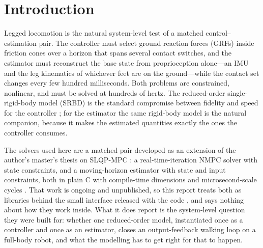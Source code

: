 \documentclass[11pt]{article}
\begin{document}
\section{Introduction}
Legged locomotion is the natural system-level test of a matched control--estimation pair. The controller must select ground reaction forces (GRFs) inside friction cones over a horizon that spans several contact switches, and the estimator must reconstruct the base state from proprioception alone---an IMU and the leg kinematics of whichever feet are on the ground---while the contact set changes every few hundred milliseconds. Both problems are constrained, nonlinear, and must be solved at hundreds of hertz. The reduced-order single-rigid-body model (SRBD) is the standard compromise between fidelity and speed for the controller \cite{dicarlo2018,bledt2018,kim2019}; for the estimator the same rigid-body model is the natural companion, because it makes the estimated quantities exactly the ones the controller consumes.

The solvers used here are a matched pair developed as an extension of the author's master's thesis on SLQP-MPC \cite{thesis}: a real-time-iteration NMPC solver with state constraints, and a moving-horizon estimator with state and input constraints, both in plain C with compile-time dimensions and microsecond-scale cycles \cite{solvers}. That work is ongoing and unpublished, so this report treats both as libraries behind the small interface released with the code \cite{repo}, and says nothing about how they work inside. What it does report is the system-level question they were built for: whether one reduced-order model, instantiated once as a controller and once as an estimator, closes an output-feedback walking loop on a full-body robot, and what the modelling has to get right for that to happen.
\end{document}
